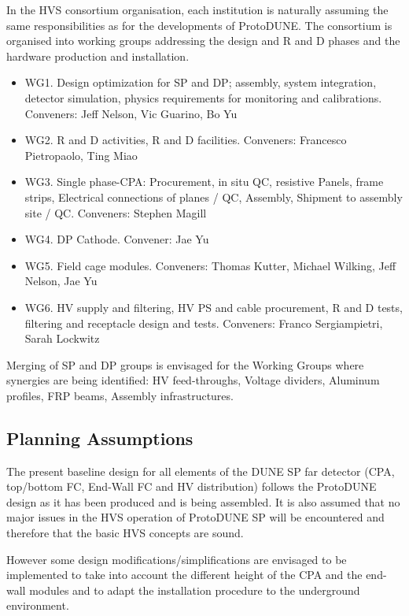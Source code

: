 In the HVS consortium organisation, each institution is naturally assuming the same responsibilities as for the developments of ProtoDUNE. The consortium is organised into working groups addressing the design and  R and D phases and the hardware production and installation.

\begin{itemize}
\item WG1. Design optimization for SP and DP; assembly, system integration, detector simulation, physics requirements for monitoring and calibrations. Conveners: Jeff Nelson, Vic Guarino, Bo Yu
\item WG2. R and D activities, R and D facilities. Conveners: Francesco Pietropaolo, Ting Miao
\item WG3. Single phase-CPA: Procurement, in situ QC, resistive Panels, frame strips, Electrical connections of planes / QC, Assembly, Shipment to assembly site / QC. Conveners: Stephen Magill
\item WG4. DP Cathode. Convener: Jae Yu
\item WG5. Field cage modules. Conveners: Thomas Kutter, Michael Wilking, Jeff Nelson, Jae Yu
\item WG6. HV supply and filtering, HV PS and cable procurement, R and D tests, filtering and receptacle design and tests. Conveners: Franco Sergiampietri, Sarah Lockwitz
\end{itemize}

\noindent Merging of SP and DP groups is envisaged for the Working Groups where synergies are being identified: HV feed-throughs, Voltage dividers, Aluminum profiles, FRP beams, Assembly infrastructures.

\subsection{Planning Assumptions}
\label{sec:fdsp-hv-org-assmp}
The present baseline design for all elements of the DUNE SP far detector (CPA, top/bottom FC, End-Wall FC and HV distribution) follows the ProtoDUNE design as it has been produced and is being assembled.  It is also assumed that no major issues in the HVS operation of ProtoDUNE SP will be encountered and therefore that the basic HVS concepts are sound.

However some design modifications/simplifications are envisaged to be implemented to take into account the different height of the CPA  and the end-wall modules and to adapt the installation procedure to the underground environment.

